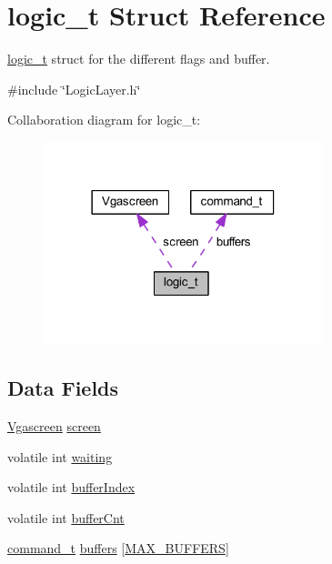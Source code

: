 \hypertarget{struct_l_l_1_1logic__t}{}\section{logic\+\_\+t Struct Reference}
\label{struct_l_l_1_1logic__t}


\mbox{\hyperlink{struct_l_l_1_1logic__t}{logic\+\_\+t}} struct for the different flags and buffer.  




{\ttfamily \#include \char`\"{}Logic\+Layer.\+h\char`\"{}}



Collaboration diagram for logic\+\_\+t\+:\nopagebreak
\begin{figure}[H]
\begin{center}
\leavevmode
\includegraphics[width=230pt]{struct_l_l_1_1logic__t__coll__graph}
\end{center}
\end{figure}
\subsection*{Data Fields}
\begin{DoxyCompactItemize}
\item 
\mbox{\hyperlink{class_vgascreen}{Vgascreen}} \mbox{\hyperlink{struct_l_l_1_1logic__t_ac344c4d62de62802f8246dc20de6c21f}{screen}}
\item 
volatile int \mbox{\hyperlink{struct_l_l_1_1logic__t_a4ed52bbb2709b6819f5afc2641f6e768}{waiting}}
\item 
volatile int \mbox{\hyperlink{struct_l_l_1_1logic__t_a4b89a73e0fa3f732d2ad4bc0982f83f1}{buffer\+Index}}
\item 
volatile int \mbox{\hyperlink{struct_l_l_1_1logic__t_af3833538ae97a141cd1c33f92d0de926}{buffer\+Cnt}}
\item 
\mbox{\hyperlink{struct_l_l_1_1command__t}{command\+\_\+t}} \mbox{\hyperlink{struct_l_l_1_1logic__t_a09663354d4cddc7fc94fce6d60c2a9a2}{buffers}} \mbox{[}\mbox{\hyperlink{group___global_ga7781bc9613ec655352585fb1bac2595d}{M\+A\+X\+\_\+\+B\+U\+F\+F\+E\+RS}}\mbox{]}
\end{DoxyCompactItemize}


